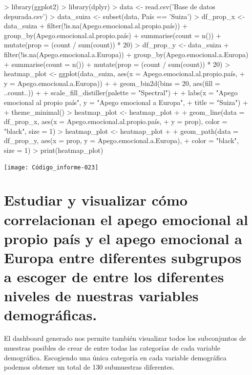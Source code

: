 \documentclass{article}
\begin{document}
\newpage
\begin{Schunk}
\begin{Sinput}
> library(ggplot2)
> library(dplyr)
> data <- read.csv('Base de datos depurada.csv')
> data_suiza <- subset(data, País == 'Suiza')
> df_prop_x <- data_suiza %
+   filter(!is.na(Apego.emocional.al.propio.país)) %
+   group_by(Apego.emocional.al.propio.país) %
+   summarise(count = n()) %
+   mutate(prop = (count / sum(count)) * 20)
> df_prop_y <- data_suiza %
+   filter(!is.na(Apego.emocional.a.Europa)) %
+   group_by(Apego.emocional.a.Europa) %
+   summarise(count = n()) %
+   mutate(prop = (count / sum(count)) * 20)
> heatmap_plot <- ggplot(data_suiza, aes(x = Apego.emocional.al.propio.país,
+                                  y = Apego.emocional.a.Europa)) +
+   geom_bin2d(bins = 20, aes(fill = ..count..)) +
+   scale_fill_distiller(palette = "Spectral") +
+   labs(x = "Apego emocional al propio país", y = "Apego emocional a Europa",
+        title = "Suiza") +
+   theme_minimal()
> heatmap_plot <- heatmap_plot +
+   geom_line(data = df_prop_x, aes(x = Apego.emocional.al.propio.país,
+                                   y = prop), color = "black", size = 1)
> heatmap_plot <- heatmap_plot +
+   geom_path(data = df_prop_y, aes(x = prop, y = Apego.emocional.a.Europa),
+             color = "black", size = 1)
> print(heatmap_plot)
\end{Sinput}
\end{Schunk}
\texttt{[image: Código\_informe-023]}

\section{Estudiar y visualizar cómo correlacionan el apego emocional al propio país y el apego emocional a Europa entre diferentes subgrupos a escoger de entre los diferentes niveles de nuestras variables demográficas.}

\noindent El dashboard generado nos permite también visualizar todos los subconjuntos de muestras posibles de crear de entre todas las categorías de cada variable demográfica. Escogiendo una única categoría en cada variable demográfica podemos obtener un total de 130 submuestras diferentes.
\end{document}
